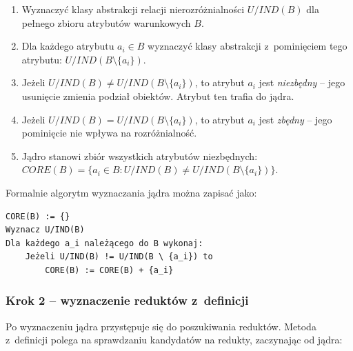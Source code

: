 \documentclass[12pt,a4paper,oneside]{article}
\begin{document}
\begin{enumerate}
    \item Wyznaczyć klasy abstrakcji relacji nierozróżnialności $U/IND(B)$ dla pełnego zbioru atrybutów warunkowych $B$.
    \item Dla każdego atrybutu $a_i \in B$ wyznaczyć klasy abstrakcji z~pominięciem tego atrybutu: $U/IND(B \setminus \{a_i\})$.
    \item Jeżeli $U/IND(B) \neq U/IND(B \setminus \{a_i\})$, to atrybut $a_i$ jest \emph{niezbędny} -- jego usunięcie zmienia podział obiektów. Atrybut ten trafia do jądra.
    \item Jeżeli $U/IND(B) = U/IND(B \setminus \{a_i\})$, to atrybut $a_i$ jest \emph{zbędny} -- jego pominięcie nie wpływa na rozróżnialność.
    \item Jądro stanowi zbiór wszystkich atrybutów niezbędnych: $CORE(B) = \{a_i \in B : U/IND(B) \neq U/IND(B \setminus \{a_i\})\}$.
\end{enumerate}

Formalnie algorytm wyznaczania jądra można zapisać jako:

\begin{verbatim}
CORE(B) := {}
Wyznacz U/IND(B)
Dla każdego a_i należącego do B wykonaj:
    Jeżeli U/IND(B) != U/IND(B \ {a_i}) to
        CORE(B) := CORE(B) + {a_i}
\end{verbatim}

\subsubsection{Krok 2 -- wyznaczenie reduktów z~definicji}

Po wyznaczeniu jądra przystępuje się do poszukiwania reduktów. Metoda z~definicji polega na sprawdzaniu kandydatów na redukty, zaczynając od jądra:
\end{document}
